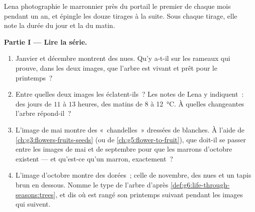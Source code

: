 \begin{problem}\label{pb:g6:life-through-seasons:1}
Lena photographie le marronnier près du portail le premier de chaque
mois pendant un an, et épingle les douze tirages à la suite. Sous
chaque tirage, elle note la durée du jour et la  du
matin.

\medskip\noindent\textbf{Partie I --- Lire la série.}
\begin{enumerate}
  \item Janvier et décembre montrent des  nues. Qu'y a-t-il
        sur les rameaux qui prouve, dans les deux images, que
        l'arbre est vivant et prêt pour le printemps~?
  \item Entre quelles deux images les  éclatent-ils~? Les
        notes de Lena y indiquent~: des jours de $11$ à $13$
        heures, des matins de $8$ à \qty{12}{\degreeCelsius}. À
        quelles  changeantes l'arbre répond-il~?
  \item L'image de mai montre des «~chandelles~» dressées de 
        blanches. À l'aide de \cref{ch:g3:flowers-fruits-seeds} (ou
        de \cref{ch:g5:flower-to-fruit}), que doit-il se passer
        entre les images de mai et de septembre pour que les
        marrons d'octobre existent --- et qu'est-ce qu'un marron,
        exactement~?
  \item L'image d'octobre montre des  dorées~; celle de
        novembre, des  nues et un tapis brun en dessous.
        Nomme le type de l'arbre d'après
        \cref{def:g6:life-through-seasons:trees}, et dis où est
        rangé son printemps suivant pendant les images qui suivent.
\end{enumerate}


\end{problem}
